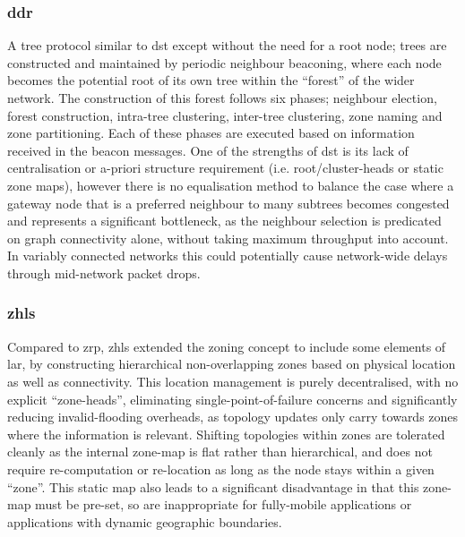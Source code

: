\subsubsection{\gls{ddr}} 
A tree protocol similar to \gls{dst} except without the need for a root node; trees are constructed and maintained by periodic neighbour beaconing, where each node becomes the potential root of its own tree within the ``forest'' of the wider network. The construction of this forest follows six phases; neighbour election, forest construction, intra-tree clustering, inter-tree clustering, zone naming and zone partitioning. Each of these phases are executed based on information received in the beacon messages. One of the strengths of \gls{dst} is its lack of centralisation or a-priori structure requirement (i.e. root/cluster-heads or static zone maps), however there is no equalisation method to balance the case where a gateway node that is a preferred neighbour to many subtrees becomes congested and represents a significant bottleneck, as the neighbour selection is predicated on graph connectivity alone, without taking maximum throughput into account. In variably connected networks this could potentially cause network-wide delays through mid-network packet drops.\\
\subsubsection{\gls{zhls}}
Compared to \gls{zrp}, \gls{zhls} extended the zoning concept to include some elements of \gls{lar}, by constructing hierarchical non-overlapping zones based on physical location as well as connectivity. This location management is purely decentralised, with no explicit ``zone-heads'', eliminating single-point-of-failure concerns and significantly reducing invalid-flooding overheads, as topology updates only carry towards zones where the information is relevant. Shifting topologies within zones are tolerated cleanly as the internal zone-map is flat rather than hierarchical, and does not require re-computation or re-location as long as the node stays within a given ``zone''. This static map also leads to a significant disadvantage in that this zone-map must be pre-set, so are inappropriate for fully-mobile applications or applications with dynamic geographic boundaries.\cite{Joa-Ng1999,Hamma2006}
